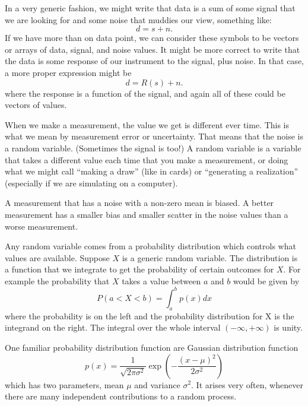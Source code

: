 In a very generic fashion, we might write that data is a sum of some signal that we are looking for and some noise that muddies our view, something like:
\begin{equation}
  d = s + n.
\end{equation}
If we have more than on data point, we can consider these symbols to be vectors or arrays of data, signal, and noise values.  It might be more correct to write that the data is some response of our instrument to the signal, plus noise.  In that case, a more proper expression might be
\begin{equation}
  d = R(s) + n.
\end{equation}
where the response is a function of the signal, and again all of these could be vectors of values.

When we make a measurement, the value we get is different ever time.  This is what we mean by measurement error or uncertainty.  That means that the noise is a random variable. (Sometimes the signal is too!)  A random variable is a variable that takes a different value each time that you make a measurement, or doing what we might call  ``making a draw'' (like in cards) or ``generating a realization'' (especially if we are simulating on a computer).

A measurement that has a noise with a non-zero mean is biased.  A better measurement has a smaller bias and smaller scatter in the noise values than a worse measurement.

Any random variable comes from a probability distribution which controls what values are available.  Suppose $X$ is a generic random variable.  The distribution is a function that we integrate to get the probability of certain outcomes for $X$.  For example the probability that $X$ takes a value between $a$ and $b$ would be given by
\begin{equation}
  P(a<X<b) = \int_a^b p(x) dx
\end{equation}
where the probability is on the left and the probability distribution for X is the integrand on the right.  The integral over the whole interval $(-\infty, +\infty)$ is unity.

One familiar probability distribution function are Gaussian distribution function
\begin{equation}
  p(x) = \frac{1}{\sqrt{2\pi \sigma^2}} \exp \left( -\frac{(x-\mu)^2}{2\sigma^2}   \right)
\end{equation}
which has two parameters, mean $\mu$ and variance $\sigma^2$.  It arises very often, whenever there are many independent contributions to a random process.

